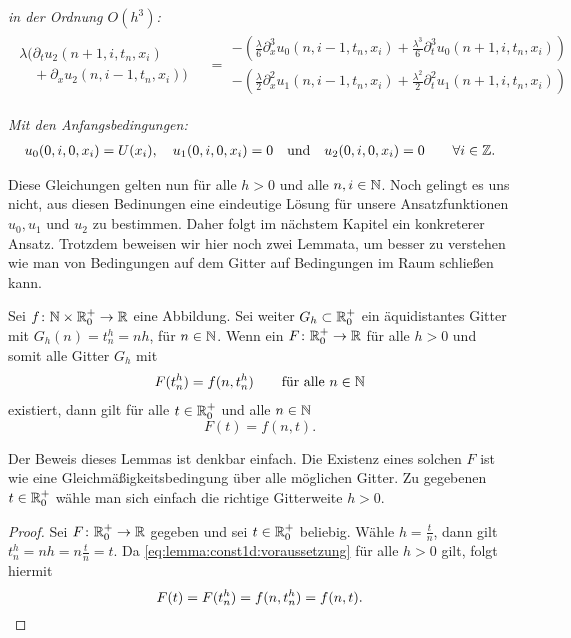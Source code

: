 \noindent \emph{in der Ordnung $O(h^3)$:}
\begin{align}\label{eq:transport:diskret:oh3}
\begin{split}
\lambda \bigl(\partial_t u_2(n+1, i, t_n, x_i)\qquad\\
\quad + \partial_x u_2(n, i-1, t_n, x_i) \bigr)
\end{split}
&= \begin{split}
- \left(\frac {\lambda}{6} \partial^3_x u_0(n, i-1, t_n, x_i) + \frac{\lambda^3}{6} \partial^3_t u_0(n+1, i, t_n, x_i)\right)\\
- \left(\frac {\lambda}{2} \partial^2_x u_1(n, i-1, t_n, x_i) + \frac{\lambda^2}{2} \partial^2_t u_1(n+1, i, t_n, x_i)\right)
\end{split}
\end{align}

\vspace{0.4cm}
\noindent \emph{Mit den Anfangsbedingungen:}
\begin{align}\label{eq:transport:diskret:anfangsbedinungen}
u_0(0, i, 0, x_i) = U(x_i), \quad u_1(0, i, 0, x_i) = 0 \quad \text{und} \quad u_2(0, i, 0, x_i) = 0 \qquad \forall i \in \mathbb Z.
\end{align}

Diese Gleichungen gelten nun für alle $h > 0$ und alle $n, i \in \mathbb N$.
Noch gelingt es uns nicht, aus diesen Bedinungen eine eindeutige Lösung für unsere Ansatzfunktionen $u_0, u_1$ und $u_2$ zu bestimmen.
Daher folgt im nächstem Kapitel ein konkreterer Ansatz.
Trotzdem beweisen wir hier noch zwei Lemmata, um besser zu verstehen wie man von Bedingungen auf dem Gitter auf Bedingungen im Raum schließen kann.

\begin{lemma} \label{lemma:transport:diskret:konstant1}
Sei $f\colon \mathbb N \times \mathbb R^+_0 \to \mathbb R$ eine Abbildung.
Sei weiter $G_h \subset \mathbb R^+_0$ ein äquidistantes Gitter mit $G_h(n) = t^h_n = n h$, für $n \in \mathbb N$.
Wenn ein $F\colon \mathbb R^+_0 \to \mathbb R$ für alle $h > 0$ und somit alle Gitter $G_h$ mit
\begin{align}\label{eq:lemma:const1d:voraussetzung}
F(t^h_n) = f(n, t^h_n) \qquad \text{für alle $n \in \mathbb N$}
\end{align}
existiert, dann gilt für alle $t \in \mathbb R^+_0$ und alle $n \in \mathbb N$
\[ F(t) = f(n, t). \]
\end{lemma}
Der Beweis dieses Lemmas ist denkbar einfach. Die Existenz eines solchen $F$ ist wie eine Gleichmäßigkeitsbedingung über alle möglichen Gitter.
Zu gegebenen $t \in \mathbb R^+_0$ wähle man sich einfach die richtige Gitterweite $h > 0$.
\begin{proof}
Sei $F\colon \mathbb R^+_0 \to \mathbb R$ gegeben und sei $t \in \mathbb R^+_0$ beliebig.
Wähle $h = \frac{t}{n}$, dann gilt $t^h_n = nh = n \frac{t}{n} = t$.
Da \eqref{eq:lemma:const1d:voraussetzung} für alle $h > 0$ gilt, folgt hiermit 
\[ F(t) = F(t^h_n) = f(n, t^h_n) = f(n, t). \qedhere \]
\end{proof}

